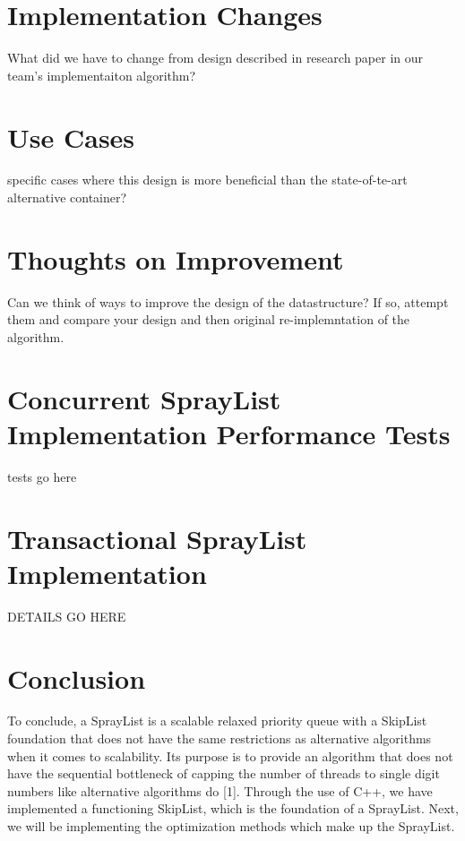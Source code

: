 \documentclass[conference]{IEEEtran}
\begin{document}
\section{Implementation Changes}
What did we have to change from design described in research paper in our team's implementaiton algorithm?

\section{Use Cases}
specific cases where this design is more beneficial than the state-of-te-art alternative container?

\section{Thoughts on Improvement}
Can we think of ways to improve the design of the datastructure? If so, attempt them and compare your design and then original re-implemntation of the algorithm.

\section{Concurrent SprayList Implementation Performance Tests}
tests go here

\section{Transactional SprayList Implementation}
DETAILS GO HERE

\section{Conclusion}

To conclude, a SprayList is a scalable relaxed priority queue with a SkipList foundation that does not have the same restrictions as alternative algorithms when it comes to scalability.  Its purpose is to provide an algorithm that does not have the sequential bottleneck of capping the number of threads to single digit numbers like alternative algorithms do [1]. Through the use of C++, we have implemented a functioning SkipList, which is the foundation of a SprayList. Next, we will be implementing the optimization methods which make up the SprayList.
\end{document}
